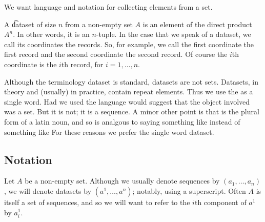 
\sbasic
















\sstart
{}


We want language and notation for collecting elements
from a set.


A \t{dataset} of size $n$ from a non-empty set $A$ is an element of the direct product $A^n$.
In other words, it is an $n$-tuple.
In the case that we speak of a dataset, we call its coordinates the records.
So, for example, we call the first coordinate the first record and the second coordinate the second record.
Of course the $i$th coordinate is the $i$th record, for $i = 1, \dots, n$.

Although the terminology dataset is standard, datasets are not sets.
Datasets, in theory and (usually) in practice, contain repeat elements.
Thus we use the  as a single word.
Had we used  the language would suggest that the object involved was a set.
But it is not; it is a sequence.
A minor other point is that  is the plural form of a latin noun, and so is analgous to saying something like  instead of something like 
For these reasons we prefer the single word dataset.

\subsection{Notation}

Let $A$ be a non-empty set.
Although we usually denote sequences by $(a_1, \dots, a_n)$, we will denote datasets by $(a^1, \dots, a^n)$; notably, using a superscript.
Often $A$ is itself a set of sequences, and so we will want to refer to the $i$th component of $a^1$ by $a^1_i$.
\strats

